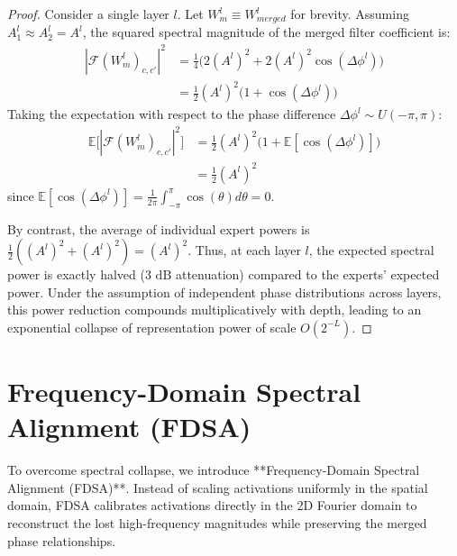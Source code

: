 \documentclass{article}
\begin{document}
\begin{proof}
Consider a single layer $l$. Let $W^l_{m} \equiv W^l_{merged}$ for brevity. Assuming $A_1^l \approx A_2^l = A^l$, the squared spectral magnitude of the merged filter coefficient is:
\begin{align*}
    | \mathcal{F}(W^l_{m})_{c,c'} |^2 &= \frac{1}{4} \big( 2(A^l)^2 + 2(A^l)^2 \cos(\Delta \phi^l) \big) \\
    &= \frac{1}{2} (A^l)^2 \big( 1 + \cos(\Delta \phi^l) \big)
\end{align*}
Taking the expectation with respect to the phase difference $\Delta \phi^l \sim U(-\pi, \pi)$:
\begin{align*}
    \mathbb{E}\big[| \mathcal{F}(W^l_{m})_{c,c'} |^2\big] &= \frac{1}{2} (A^l)^2 \big( 1 + \mathbb{E}[\cos(\Delta \phi^l)] \big) \\
    &= \frac{1}{2} (A^l)^2
\end{align*}
since $\mathbb{E}[\cos(\Delta \phi^l)] = \frac{1}{2\pi} \int_{-\pi}^{\pi} \cos(\theta) d\theta = 0$.

By contrast, the average of individual expert powers is $\frac{1}{2} \left( (A^l)^2 + (A^l)^2 \right) = (A^l)^2$. Thus, at each layer $l$, the expected spectral power is exactly halved ($3\text{ dB}$ attenuation) compared to the experts' expected power. Under the assumption of independent phase distributions across layers, this power reduction compounds multiplicatively with depth, leading to an exponential collapse of representation power of scale $O(2^{-L})$.
\end{proof}

\section{Frequency-Domain Spectral Alignment (FDSA)}
\label{sec:method}
To overcome spectral collapse, we introduce **Frequency-Domain Spectral Alignment (FDSA)**. Instead of scaling activations uniformly in the spatial domain, FDSA calibrates activations directly in the 2D Fourier domain to reconstruct the lost high-frequency magnitudes while preserving the merged phase relationships.
\end{document}
